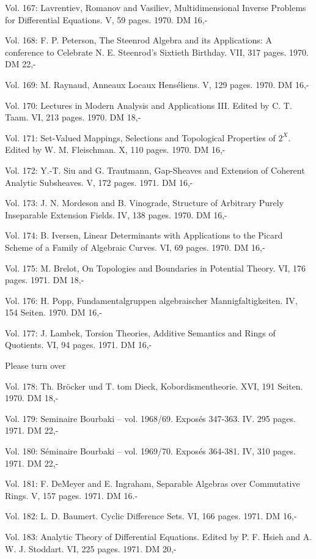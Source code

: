 Vol. 167: Lavrentiev, Romanov and Vasiliev, Multidimensional Inverse Problems for Differential Equations. V, 59 pages. 1970. DM 16,-

Vol. 168: F. P. Peterson, The Steenrod Algebra and its Applications: A conference to Celebrate N. E. Steenrod's Sixtieth Birthday. VII, 317 pages. 1970. DM 22,-

Vol. 169: M. Raynaud, Anneaux Locaux Henséliens. V, 129 pages. 1970. DM 16,-

Vol. 170: Lectures in Modern Analysis and Applications III. Edited by C. T. Taam. VI, 213 pages. 1970. DM 18,-

Vol. 171: Set-Valued Mappings, Selections and Topological Properties of $2^X$. Edited by W. M. Fleischman. X, 110 pages. 1970. DM 16,-

Vol. 172: Y.-T. Siu and G. Trautmann, Gap-Sheaves and Extension of Coherent Analytic Subsheaves. V, 172 pages. 1971. DM 16,-

Vol. 173: J. N. Mordeson and B. Vinograde, Structure of Arbitrary Purely Inseparable Extension Fields. IV, 138 pages. 1970. DM 16,-

Vol. 174: B. Iversen, Linear Determinants with Applications to the Picard Scheme of a Family of Algebraic Curves. VI, 69 pages. 1970. DM 16,-

Vol. 175: M. Brelot, On Topologies and Boundaries in Potential Theory. VI, 176 pages. 1971. DM 18,-

Vol. 176: H. Popp, Fundamentalgruppen algebraischer Mannigfaltigkeiten. IV, 154 Seiten. 1970. DM 16,-

Vol. 177: J. Lambek, Torsion Theories, Additive Semantics and Rings of Quotients. VI, 94 pages. 1971. DM 16,-

Please turn over



Vol. 178: Th. Bröcker und T. tom Dieck, Kobordismentheorie. XVI, 191 Seiten. 1970. DM 18,-

Vol. 179: Seminaire Bourbaki -- vol. 1968/69. Exposés 347-363. IV. 295 pages. 1971. DM 22,-

Vol. 180: Séminaire Bourbaki -- vol. 1969/70. Exposés 364-381. IV, 310 pages. 1971. DM 22,-

Vol. 181: F. DeMeyer and E. Ingraham, Separable Algebras over Commutative Rings. V, 157 pages. 1971. DM 16.-

Vol. 182: L. D. Baumert. Cyclic Difference Sets. VI, 166 pages. 1971. DM 16,-

Vol. 183: Analytic Theory of Differential Equations. Edited by P. F. Hsieh and A. W. J. Stoddart. VI, 225 pages. 1971. DM 20,-

